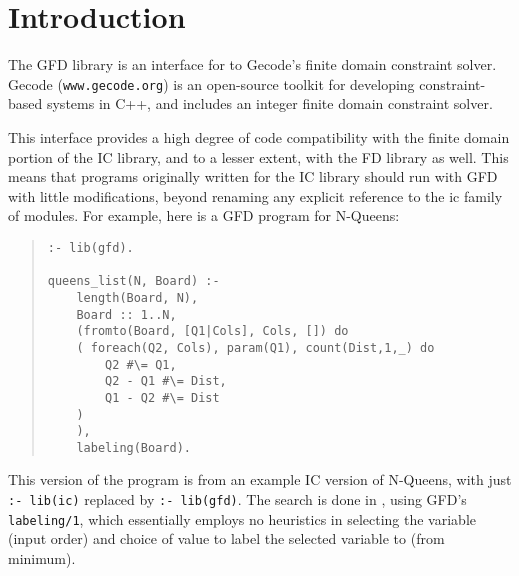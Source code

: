 %
% 
% 
% 
% 


\section{Introduction}

   The GFD library is an interface for {\eclipse} to Gecode's finite domain constraint
   solver. Gecode ({\tt www.gecode.org}) is an open-source toolkit for 
   developing
   constraint-based systems in C++, and includes an  integer 
   finite domain constraint solver.

   This interface provides a high degree of code compatibility with the finite 
   domain portion of the IC library, and to a lesser extent, with the FD
   library as well. This means that programs originally written for the
   IC library should run with GFD with little modifications, beyond 
   renaming any explicit reference to the ic family of modules. For example,
   here is a GFD program for N-Queens:

\begin{quote}
\begin{verbatim}
:- lib(gfd).

queens_list(N, Board) :-
    length(Board, N),
    Board :: 1..N,
    (fromto(Board, [Q1|Cols], Cols, []) do
	( foreach(Q2, Cols), param(Q1), count(Dist,1,_) do
	    Q2 #\= Q1,
	    Q2 - Q1 #\= Dist,
	    Q1 - Q2 #\= Dist
	)
    ),
    labeling(Board).  
\end{verbatim}
\end{quote}

This version of the program is from an example IC version of N-Queens,
with just \verb':- lib(ic)' replaced by \verb':- lib(gfd)'. The
search is done in \eclipse, using GFD's \verb'labeling/1', which essentially
employs no heuristics in selecting the variable (input order) and choice of 
value to label the selected variable to (from minimum).



